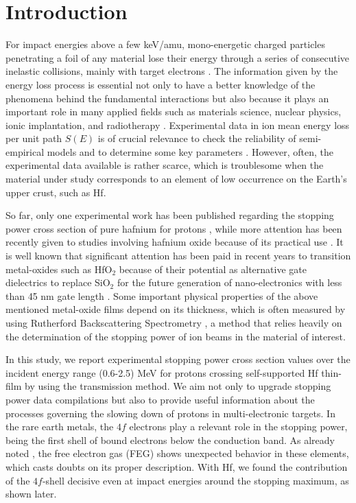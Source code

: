 \documentclass[aps,prb,reprint,groupedaddress]{revtex4-1}
\begin{document}
\section{Introduction}
\label{intro}

For impact energies above a few keV/amu, mono-energetic charged particles penetrating a foil of any material lose their energy through a series of consecutive inelastic collisions, mainly with target electrons \cite{Chu01,Sigmund}. 
The information given by the energy loss process is essential not only to have a better knowledge of the phenomena behind the fundamental interactions but also because it plays an important role in many applied fields such as materials science, nuclear physics, ionic implantation, and radiotherapy \cite{Sigmund,Schardt}. 
Experimental data in ion mean energy loss per unit path $S(E)$ is of crucial relevance to check the reliability of semi-empirical models and to determine some key parameters \cite{Diwan,Damache04,Damache02}. 
However, often, the experimental data available is rather scarce, which is troublesome when the material under study corresponds to an element of low occurrence on the Earth's upper crust, such as Hf.

So far, only one experimental work has been published regarding the stopping power cross section of pure hafnium for protons \cite{Sirotinin}, while more attention has been recently given to studies involving hafnium oxide because of its practical use \cite{Abril,Behar,Primetzhofer}. 
It is well known that significant attention has been paid in recent years to transition metal-oxides such as HfO$_2$ because of their potential as alternative gate dielectrics to replace SiO$_2$ for the future generation of nano-electronics with less than 45 nm gate length \cite{Choi,Robertson}. 
Some important physical properties of the above mentioned metal-oxide films depend on its thickness, which is often measured by using Rutherford Backscattering Spectrometry \cite{Alfassi01, Tesmer01}, a method that relies heavily on the determination of the stopping power of ion beams in the material of interest.

In this study, we report experimental stopping power cross section values over the incident energy range (0.6-2.5) MeV for protons crossing self-supported Hf thin-film by using the transmission method.
We aim not only to upgrade stopping power data compilations \cite{HPaul03,mondim17} but also to provide useful information about the processes governing the slowing down of protons in multi-electronic targets. 
In the rare earth metals, the $4f$ electrons play a relevant role in the stopping power, being the first shell of bound electrons below the conduction band. As already noted \cite{Roth17}, the free electron gas (FEG) shows unexpected behavior in these elements, which casts doubts on its proper description. With Hf, we found the contribution of the $4f$-shell decisive even at impact energies around the stopping maximum, as shown later.
\end{document}
